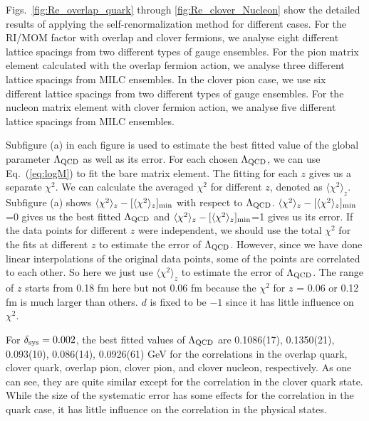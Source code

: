 Figs.~\ref{fig:Re_overlap_quark} through \ref{fig:Re_clover_Nucleon} show the detailed results of applying the
self-renormalization method for different cases. For the RI/MOM factor with overlap and clover fermions, we analyse eight different lattice spacings from two different types of gauge ensembles. For the pion matrix element calculated with the overlap fermion action, we analyse three different lattice spacings from MILC ensembles. In the clover pion case, we use six different lattice spacings from two different types of gauge ensembles. For the nucleon matrix element with clover fermion action, we analyse five different lattice spacings from MILC ensembles. 

Subfigure (a) in each figure is used to estimate the best fitted value of the global parameter $\Lambda_{\rm QCD}$ as well as its error. For each chosen $\Lambda_{\rm QCD}$, we can use Eq.~(\ref{eq:logM}) to fit the bare matrix element. The fitting for each $z$ gives us a separate $\chi^{2}$. We can calculate the averaged $\chi^{2}$ for different $z$, denoted as $\langle  \chi^{2} \rangle_{z}$. Subfigure (a) shows $\langle  \chi^{2} \rangle_{z} - [\langle  \chi^{2} \rangle_{z}]_{\rm min}$ with respect to $\Lambda_{\rm QCD}$. $\langle  \chi^{2} \rangle_{z} - [\langle  \chi^{2} \rangle_{z}]_{\rm min}$=0 gives us the best fitted $\Lambda_{\rm QCD}$ and $\langle  \chi^{2} \rangle_{z} - [\langle  \chi^{2} \rangle_{z}]_{\rm min}$=1 gives us its error. If the data points for different $z$ were independent, we should use the total $\chi^{2}$ for the fits at different $z$ to estimate the error of $\Lambda_{\rm QCD}$. However, since we have done linear interpolations of the original data points, some of the points are correlated to each other. So here we just use $\langle  \chi^{2} \rangle_{z}$ to estimate the error of $\Lambda_{\rm QCD}$. The range of $z$ starts from 0.18 fm here but not 0.06 fm because the $\chi^{2}$ for $z$ = 0.06 or 0.12 fm is much larger than others. $d$ is fixed to be $-1$ since it has little influence on $\chi^{2}$. 

For $\delta_{\rm sys}=0.002$, the best fitted values of $\Lambda_{\rm QCD}$ are 0.1086(17), 0.1350(21), 0.093(10), 0.086(14), 0.0926(61) GeV for the correlations in the overlap quark, clover quark, overlap pion, clover pion, and clover nucleon, respectively. As one can see, they are quite similar except for the correlation in the clover quark state. While the size of the systematic
error has some effects for the correlation in the quark case, it has little influence on the correlation in the physical 
states. 

